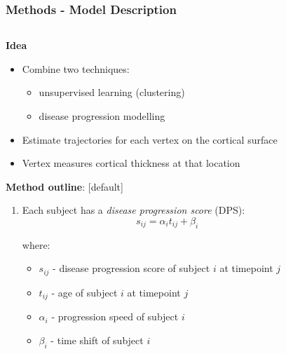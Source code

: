 \documentclass[8pt,xcolor=table]{beamer}
\begin{document}
\begin{frame}
\frametitle{Methods - Model Description}

\begin{columns}[T]
    \begin{column}{.7\textwidth}
    
    \textbf{Idea}
    \begin{itemize}
      \item Combine two techniques:
      \begin{itemize}
      \item unsupervised learning (clustering)
      \item disease progression modelling
      \end{itemize}
      
      \item Estimate trajectories for each vertex on the cortical surface
      \item Vertex measures cortical thickness at that location

    \end{itemize}
    
    
    \vspace{2em}
   
    \textbf{Method outline}:
    [default]
     \begin{enumerate}
      \item Each subject has a \emph{disease progression score} (DPS):
      $$s_{ij} = \alpha_i t_{ij} + \beta_i$$
      
      where:
      \begin{itemize}
       \item $s_{ij}$ - disease progression score of subject $i$ at timepoint $j$
       \item $t_{ij}$ - age of subject $i$ at timepoint $j$
       \item $\alpha_i $ - progression speed of subject $i$
       \item $\beta_i $ - time shift of subject $i$
      \end{itemize}
            
     \end{enumerate}
     

    \end{column}
    \hspace{-2em}
    \begin{column}{.25\textwidth}
    

\end{column}
\end{columns}
\end{frame}
\end{document}
